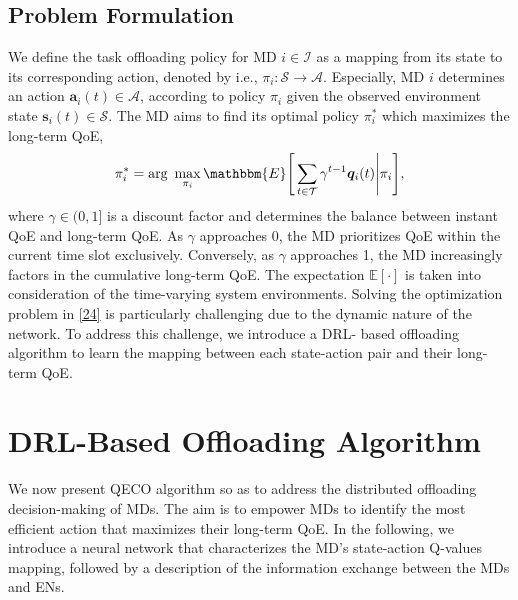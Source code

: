 \documentclass[12pt,draftclsnofoot,onecolumn]{IEEEtran}
\begin{document}
\subsection{Problem Formulation}
We define the task offloading policy for MD $i \in \mathcal{I}$ as a mapping from its state to its corresponding action, denoted by i.e., $\pi_i : \mathcal{S} \rightarrow \mathcal{A}$. Especially, MD $i$ determines an action $\boldsymbol{a}_i(t) \in \mathcal{A}$, according to policy $\pi_i$ given the observed environment state $\boldsymbol{s}_i(t) \in \mathcal{S}$. The MD aims to find its optimal policy $\pi_i^*$ which maximizes the long-term QoE,
\begin{alignat}{1}
	\pi_i^* = \text{arg}\,\,  \max\limits_{\pi_i}  \mathbbm{E} \Bigg[ \sum\limits_{t \in \mathcal{T}}  \gamma^{t-1}\boldsymbol{q}_i(t) \Bigg| \pi_i \Bigg],
	\label{24}  
\end{alignat}
where $\gamma \in (0,1]$ is a discount factor and determines the balance between instant QoE and long-term QoE. As $\gamma$ approaches 0, the MD prioritizes QoE within the current time slot exclusively. Conversely, as $\gamma$ approaches 1, the MD increasingly factors in the cumulative long-term QoE. The expectation $\mathbb{E}[\cdot]$ is taken into consideration of the time-varying system environments. Solving the optimization problem in \eqref{24} is particularly challenging due to the dynamic nature of the network. To address this challenge, we introduce a DRL- based offloading algorithm to learn the mapping between each state-action pair and their long-term QoE.
\section{DRL-Based Offloading Algorithm} \label{section:V}
We now present QECO algorithm so as to address the distributed offloading decision-making of MDs. The aim is to empower MDs to identify the most efficient action that maximizes their long-term QoE. In the following, we introduce a neural network that characterizes the MD's state-action Q-values mapping, followed by a description of the information exchange between the MDs and ENs.
\end{document}
